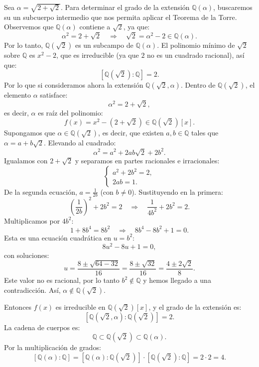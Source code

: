 \begin{solucion}

Sea $\alpha = \sqrt{2 + \sqrt{2}}$. Para determinar el grado de la extensión $\mathbb{Q}(\alpha)$, buscaremos su un subcuerpo intermedio que nos permita aplicar el Teorema de la Torre.
Observemos que $\mathbb{Q}(\alpha)$ contiene a $\sqrt{2}$, ya que:
\[
\alpha^2 = 2 + \sqrt{2} \quad \Rightarrow \quad \sqrt{2} = \alpha^2 - 2 \in \mathbb{Q}(\alpha).
\]
Por lo tanto, $\mathbb{Q}(\sqrt{2})$ es un subcampo de $\mathbb{Q}(\alpha)$. El polinomio mínimo de $\sqrt{2}$ sobre $\mathbb{Q}$ es $x^2 - 2$, que es irreducible (ya que $2$ no es un cuadrado racional), así que:
\[
[\mathbb{Q}(\sqrt{2}) : \mathbb{Q}] = 2.
\]
Por lo que si consideramos ahora la extensión $\mathbb{Q}(\sqrt{2}, \alpha)$. Dentro de $\mathbb{Q}(\sqrt{2})$, el elemento $\alpha$ satisface:
\[
\alpha^2 = 2 + \sqrt{2},
\]
es decir, $\alpha$ es raíz del polinomio:
\[
f(x) = x^2 - (2 + \sqrt{2}) \in \mathbb{Q}(\sqrt{2})[x].
\]
Supongamos que $\alpha \in \mathbb{Q}(\sqrt{2})$, es decir, que existen $a, b \in \mathbb{Q}$ tales que $\alpha = a + b\sqrt{2}$. Elevando al cuadrado:
\[
\alpha^2 = a^2 + 2ab\sqrt{2} + 2b^2.
\]
Igualamos con $2 + \sqrt{2}$ y separamos en partes racionales e irracionales:
\[
\begin{cases}
a^2 + 2b^2 = 2,\\
2ab = 1.
\end{cases}
\]
De la segunda ecuación, $a = \frac{1}{2b}$ (con $b \ne 0$). Sustituyendo en la primera:
\[
\left(\frac{1}{2b}\right)^2 + 2b^2 = 2 \quad \Rightarrow \quad \frac{1}{4b^2} + 2b^2 = 2.
\]
Multiplicamos por $4b^2$:
\[
1 + 8b^4 = 8b^2 \quad \Rightarrow \quad 8b^4 - 8b^2 + 1 = 0.
\]
Esta es una ecuación cuadrática en $u = b^2$:
\[
8u^2 - 8u + 1 = 0,
\]
con soluciones:
\[
u = \frac{8 \pm \sqrt{64 - 32}}{16} = \frac{8 \pm \sqrt{32}}{16} = \frac{4 \pm 2\sqrt{2}}{8}.
\]
Este valor no es racional, por lo tanto $b^2 \notin \mathbb{Q}$ y hemos llegado a una contradicción. Así, $\alpha \notin \mathbb{Q}(\sqrt{2})$.

Entonces $f(x)$ es irreducible en $\mathbb{Q}(\sqrt{2})[x]$, y el grado de la extensión es:
\[
[\mathbb{Q}(\sqrt{2}, \alpha) : \mathbb{Q}(\sqrt{2})] = 2.
\]
La cadena de cuerpos es:
\[
\mathbb{Q} \subset \mathbb{Q}(\sqrt{2}) \subset \mathbb{Q}(\alpha).
\]
Por la multiplicación de grados:
\[
[\mathbb{Q}(\alpha) : \mathbb{Q}] = [\mathbb{Q}(\alpha) : \mathbb{Q}(\sqrt{2})] \cdot [\mathbb{Q}(\sqrt{2}) : \mathbb{Q}] = 2 \cdot 2 = 4.
\]




\end{solucion}
